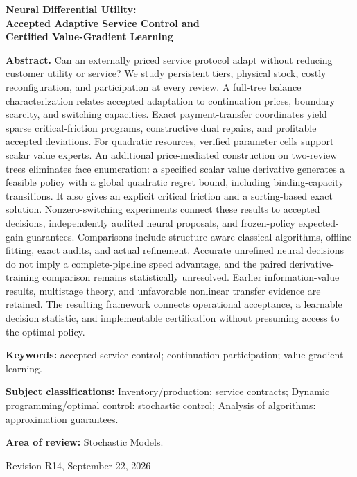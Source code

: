 \documentclass[11pt,letterpaper]{article}
\theoremstyle{definition}
\newcommand{\1}{\mathbf 1}
\begin{document}
\begin{titlepage}\centering
{\Large\bfseries Neural Differential Utility:\\ Accepted Adaptive Service Control and\\ Certified Value-Gradient Learning\par}
\vspace{.3in}{Anonymous manuscript for Operations Research\par}\vspace{.25in}
\begin{minipage}{\textwidth}
\textbf{Abstract.}
Can an externally priced service protocol adapt without reducing customer utility or service? We study persistent tiers, physical stock, costly reconfiguration, and participation at every review. A full-tree balance characterization relates accepted adaptation to continuation prices, boundary scarcity, and switching capacities. Exact payment-transfer coordinates yield sparse critical-friction programs, constructive dual repairs, and profitable accepted deviations. For quadratic resources, verified parameter cells support scalar value experts. An additional price-mediated construction on two-review trees eliminates face enumeration: a specified scalar value derivative generates a feasible policy with a global quadratic regret bound, including binding-capacity transitions. It also gives an explicit critical friction and a sorting-based exact solution. Nonzero-switching experiments connect these results to accepted decisions, independently audited neural proposals, and frozen-policy expected-gain guarantees. Comparisons include structure-aware classical algorithms, offline fitting, exact audits, and actual refinement. Accurate unrefined neural decisions do not imply a complete-pipeline speed advantage, and the paired derivative-training comparison remains statistically unresolved. Earlier information-value results, multistage theory, and unfavorable nonlinear transfer evidence are retained. The resulting framework connects operational acceptance, a learnable decision statistic, and implementable certification without presuming access to the optimal policy.
\par\vspace{.16in}\textbf{Keywords:} accepted service control; continuation participation; value-gradient learning.
\par\vspace{.10in}\textbf{Subject classifications:} Inventory/production: service contracts; Dynamic programming/optimal control: stochastic control; Analysis of algorithms: approximation guarantees.
\par\vspace{.10in}\textbf{Area of review:} Stochastic Models.
\end{minipage}\vfill{Revision R14, September 22, 2026\par}\end{titlepage}
\end{document}
